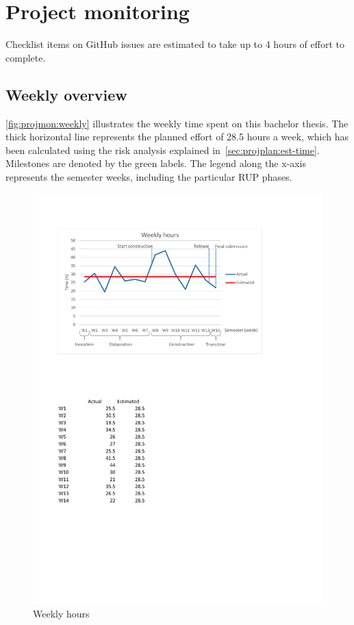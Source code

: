 \chapter{Project monitoring}
Checklist items on GitHub issues are estimated to take up to 4 hours of effort to complete.

\section{Weekly overview}

\autoref{fig:projmon:weekly} illustrates the weekly time spent on this bachelor
thesis. The thick horizontal line represents the planned effort of 28.5 hours a
week, which has been calculated using the risk analysis explained
in~\autoref{sec:projplan:est-time}.  Milestones are denoted by the green
labels. The legend along the x-axis represents the semester weeks, including
the particular RUP phases.


\begin{figure}[]
	\includegraphics[trim=2cm 18.3cm 4.6cm 2.8cm, clip=true, width=\textwidth]{img/project_monitoring_weekly_hours_diagram.pdf}
	\caption{Weekly hours}
	\label{fig:weekly:hours}
\end{figure}

